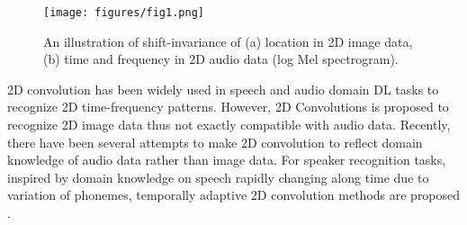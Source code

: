 \documentclass[a4paper]{article}
\begin{document}
\begin{figure}[ht]
\centerline{\texttt{[image: figures/fig1.png]}}
\vspace{-8pt}
\caption{An illustration of shift-invariance of (a) location in 2D image data, (b) time and frequency in 2D audio data (log Mel spectrogram).}
\label{fig:equivariance}
\vspace{-10pt}
\end{figure}

2D convolution has been widely used in speech and audio domain DL tasks to recognize 2D time-frequency patterns. However, 2D Convolutions is proposed to recognize 2D image data thus not exactly compatible with audio data. Recently, there have been several attempts to make 2D convolution to reflect domain knowledge of audio data rather than image data. For speaker recognition tasks, inspired by domain knowledge on speech rapidly changing along time due to variation of phonemes, temporally adaptive 2D convolution methods are proposed \cite{acnn, tdycnn, DTDY}.
\end{document}
